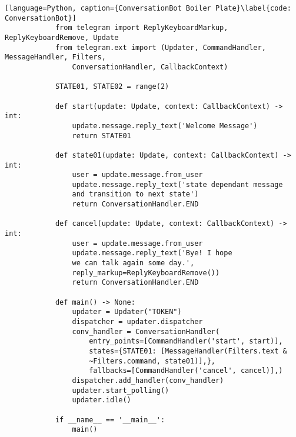         \begin{lstlisting}[language=Python, caption={ConversationBot Boiler Plate}\label{code: ConversationBot}]
            from telegram import ReplyKeyboardMarkup, ReplyKeyboardRemove, Update
            from telegram.ext import (Updater, CommandHandler, MessageHandler, Filters,
                ConversationHandler, CallbackContext)
            
            STATE01, STATE02 = range(2)
            
            def start(update: Update, context: CallbackContext) -> int:
                update.message.reply_text('Welcome Message')
                return STATE01
            
            def state01(update: Update, context: CallbackContext) -> int:
                user = update.message.from_user
                update.message.reply_text('state dependant message 
                and transition to next state')
                return ConversationHandler.END
            
            def cancel(update: Update, context: CallbackContext) -> int:
                user = update.message.from_user
                update.message.reply_text('Bye! I hope 
                we can talk again some day.', 
                reply_markup=ReplyKeyboardRemove())
                return ConversationHandler.END
            
            def main() -> None:
                updater = Updater("TOKEN")
                dispatcher = updater.dispatcher
                conv_handler = ConversationHandler(
                    entry_points=[CommandHandler('start', start)],
                    states={STATE01: [MessageHandler(Filters.text & 
                    ~Filters.command, state01)],},
                    fallbacks=[CommandHandler('cancel', cancel)],)
                dispatcher.add_handler(conv_handler)
                updater.start_polling()
                updater.idle()
            
            if __name__ == '__main__':
                main()
        \end{lstlisting}


